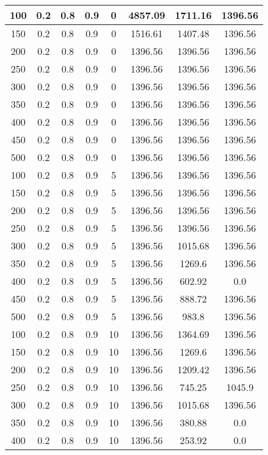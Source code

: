 \documentclass[a4paper, 12pt]{extreport}
\begin{document}
\begin{itemize}
\begin{longtable}{|c|c|c|c|c|c|c|c|}
			100 & 0.2 & 0.8 & 0.9 & 0 & 4857.09 & 1711.16 & 1396.56 \\\hline
			150 & 0.2 & 0.8 & 0.9 & 0 & 1516.61 & 1407.48 & 1396.56 \\\hline
			200 & 0.2 & 0.8 & 0.9 & 0 & 1396.56 & 1396.56 & 1396.56 \\\hline
			250 & 0.2 & 0.8 & 0.9 & 0 & 1396.56 & 1396.56 & 1396.56 \\\hline
			300 & 0.2 & 0.8 & 0.9 & 0 & 1396.56 & 1396.56 & 1396.56 \\\hline
			350 & 0.2 & 0.8 & 0.9 & 0 & 1396.56 & 1396.56 & 1396.56 \\\hline
			400 & 0.2 & 0.8 & 0.9 & 0 & 1396.56 & 1396.56 & 1396.56 \\\hline
			450 & 0.2 & 0.8 & 0.9 & 0 & 1396.56 & 1396.56 & 1396.56 \\\hline
			500 & 0.2 & 0.8 & 0.9 & 0 & 1396.56 & 1396.56 & 1396.56 \\\hline
			100 & 0.2 & 0.8 & 0.9 & 5 & 1396.56 & 1396.56 & 1396.56 \\\hline
			150 & 0.2 & 0.8 & 0.9 & 5 & 1396.56 & 1396.56 & 1396.56 \\\hline
			200 & 0.2 & 0.8 & 0.9 & 5 & 1396.56 & 1396.56 & 1396.56 \\\hline
			250 & 0.2 & 0.8 & 0.9 & 5 & 1396.56 & 1396.56 & 1396.56 \\\hline
			300 & 0.2 & 0.8 & 0.9 & 5 & 1396.56 & 1015.68 & 1396.56 \\\hline
			350 & 0.2 & 0.8 & 0.9 & 5 & 1396.56 & 1269.6 & 1396.56 \\\hline
			400 & 0.2 & 0.8 & 0.9 & 5 & 1396.56 & 602.92 & 0.0 \\\hline
			450 & 0.2 & 0.8 & 0.9 & 5 & 1396.56 & 888.72 & 1396.56 \\\hline
			500 & 0.2 & 0.8 & 0.9 & 5 & 1396.56 & 983.8 & 1396.56 \\\hline
			100 & 0.2 & 0.8 & 0.9 & 10 & 1396.56 & 1364.69 & 1396.56 \\\hline
			150 & 0.2 & 0.8 & 0.9 & 10 & 1396.56 & 1269.6 & 1396.56 \\\hline
			200 & 0.2 & 0.8 & 0.9 & 10 & 1396.56 & 1209.42 & 1396.56 \\\hline
			250 & 0.2 & 0.8 & 0.9 & 10 & 1396.56 & 745.25 & 1045.9 \\\hline
			300 & 0.2 & 0.8 & 0.9 & 10 & 1396.56 & 1015.68 & 1396.56 \\\hline
			350 & 0.2 & 0.8 & 0.9 & 10 & 1396.56 & 380.88 & 0.0 \\\hline
			400 & 0.2 & 0.8 & 0.9 & 10 & 1396.56 & 253.92 & 0.0 \\\hline

\end{longtable}
\end{itemize}
\end{document}

